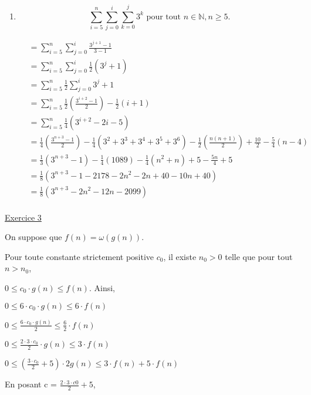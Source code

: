 \documentclass[11pt]{article}
\begin{document}
\begin{enumerate}[label=\alph*)]
     \item $$ \sum_{i=5}^{n} \sum_{j=0}^{i}\sum_{k=0}^{j}3^k  \textrm{ pour tout } n \in \mathbb{N}, n\geq 5.$$

    \begin{align*}
        &=\sum_{i=5}^{n} \sum_{j=0}^{i}\frac{3^{j+1}-1}{3-1}\\
        &=\sum_{i=5}^{n} \sum_{j=0}^{i}\frac{1}{2}\left(3^{j}+1\right)\\
        &=\sum_{i=5}^{n} \frac{1}{2}\sum_{j=0}^{i}3^{j}+1\\
        &=\sum_{i=5}^{n} \frac{1}{2}\left(\frac{3^{i+2}-1}{2}\right) -\frac{1}{2}\left(i+1\right)\\
        &=\sum_{i=5}^{n} \frac{1}{4}\left(3^{i+2}-2i-5\right)\\
        &=\frac{1}{4}\left(\frac{3^{n+3}-1}{2}\right)-\frac{1}{4}(3^{2}+3^{3}+3^{4}+3^{5}+3^{6})-\frac{1}{2}\left(\frac{n(n+1)}{2}\right)+\frac{10}{2}-\frac{5}{4}(n-4)\\
        &=\frac{1}{3}\left(3^{n+3}-1\right)-\frac{1}{4}(1089)-\frac{1}{4}(n^{2}+n)+5-\frac{5n}{4}+5\\
        &=\frac{1}{8}\left(3^{n+3}-1-2178-2n^{2}-2n+40-10n+40\right)\\
        &=\frac{1}{8}\left(3^{n+3}-2n^{2}-12n-2099\right)\\
    \end{align*}
  
\end{enumerate}

\bigskip

\underline{Exercice 3} 

    On suppose que $f(n) = \omega\left(g(n)\right)$.

    Pour toute constante strictement positive $c_0$, il existe $n_0>0$ telle que pour tout $n > n_0$,
    
    $0\leq c_0\cdot g(n)\leq f(n)$.
    Ainsi,

    $0\leq 6\cdot c_0\cdot g(n)\leq 6\cdot f(n)$ 
    
    $0\leq \frac{6\cdot c_0\cdot g(n)}{2}\leq \frac{6}{2}\cdot f(n)$

    $0 \leq \frac{2\cdot 3\cdot c_0}{2}\cdot g(n)\leq 3\cdot f(n)$

    $0 \leq \left(\frac{ 3\cdot c_0}{2}+5\right)\cdot 2g(n)\leq 3\cdot f(n) + 5\cdot f(n)$
    
   \bigskip 

    En posant c = $\frac{2\cdot 3\cdot c0}{2}+5$,
\end{document}
